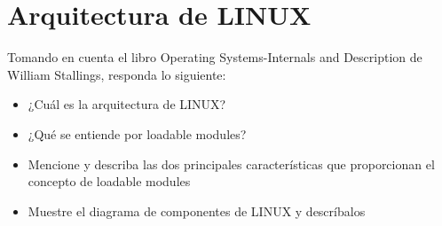 \section{Arquitectura de LINUX}

	Tomando en cuenta el libro Operating Systems-Internals and Description de William Stallings, responda lo siguiente:

	\begin{itemize}

		\item ¿Cuál es la arquitectura de LINUX?
		\item ¿Qué se entiende por loadable modules?
		\item Mencione y describa las dos principales características que proporcionan el concepto de loadable modules
		\item Muestre el diagrama de componentes de LINUX y descríbalos

	\end{itemize}